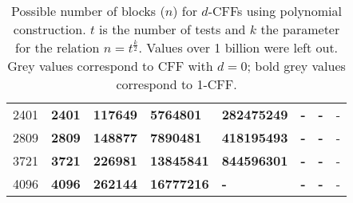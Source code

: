 \begin{table}[h]
\begin{tabular}{|l|lllllll}
2401         & \textbf{2401}            & \textbf{117649}                               & \textbf{5764801}                    & \textbf{282475249}                    & \textbf{-}                             & \textbf{-}                               & -                                         \\ \cline{1-1}
2809         & \textbf{2809}            & \textbf{148877}                               & \textbf{7890481}                    & \textbf{418195493}                    & \textbf{-}                             & \textbf{-}                               & -                                         \\ \cline{1-1}
3721         & \textbf{3721}            & \textbf{226981}                               & \textbf{13845841}                   & \textbf{844596301}                    & \textbf{-}                             & \textbf{-}                               & -                                         \\ \cline{1-1}
4096         & \textbf{4096}            & \textbf{262144}                               & \textbf{16777216}                   & \textbf{-}                            & \textbf{-}                             & \textbf{-}                               & -                                         \\ \cline{1-1}
\end{tabular}
    \caption{Possible number of blocks ($n$) for $d$-CFFs using polynomial construction. $t$ is the number of tests and $k$ the parameter for the relation $n = t^{\frac{k}{2}}$. Values over 1 billion were left out. Grey values correspond to CFF with $d = 0$; bold grey values correspond to 1-CFF.}
    \label{table:blocks-polynomial-cff-t-k}
\end{table}